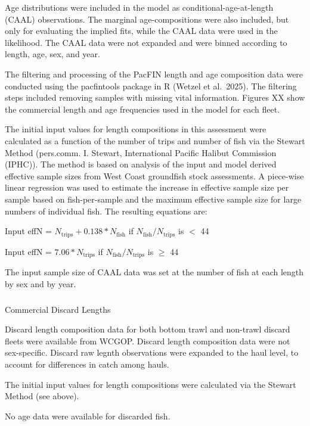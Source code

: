 \documentclass[
]{scrartcl}
\makeatletter
\let\oldsubparagraph\subparagraph
\renewcommand{\subparagraph}{
    \@ifstar
      \xxxSubParagraphStar
      \xxxSubParagraphNoStar
  }
\newcommand{\xxxSubParagraphStar}[1]{\oldsubparagraph*{#1}\mbox{}}
\newcommand{\xxxSubParagraphNoStar}[1]{\oldsubparagraph{#1}\mbox{}}
\makeatother
\begin{document}
Age distributions were included in the model as
conditional-age-at-length (CAAL) observations. The marginal
age-compositions were also included, but only for evaluating the implied
fits, while the CAAL data were used in the likelihood. The CAAL data
were not expanded and were binned according to length, age, sex, and
year.

The filtering and processing of the PacFIN length and age composition
data were conducted using the pacfintools package in R (Wetzel et
al.~2025). The filtering steps included removing samples with missing
vital information. Figures XX show the commercial length and age
frequencies used in the model for each fleet.

The initial input values for length compositions in this assessment were
calculated as a function of the number of trips and number of fish via
the Stewart Method (pers.comm. I. Stewart, International Pacific Halibut
Commission (IPHC)). The method is based on analysis of the input and
model derived effective sample sizes from West Coast groundfish stock
assessments. A piece-wise linear regression was used to estimate the
increase in effective sample size per sample based on fish-per-sample
and the maximum effective sample size for large numbers of individual
fish. The resulting equations are:

\begin{centering}

Input effN = $N_{\text{trips}} + 0.138 * N_{\text{fish}}$ if $N_{\text{fish}}/N_{\text{trips}}$ is $<$ 44

Input effN = $7.06 * N_{\text{trips}}$ if $N_{\text{fish}}/N_{\text{trips}}$ is $\geq$ 44

\end{centering}

The input sample size of CAAL data was set at the number of fish at each
length by sex and by year.

\subparagraph{Commercial Discard
Lengths}\label{commercial-discard-lengths}

Discard length composition data for both bottom trawl and non-trawl
discard fleets were available from WCGOP. Discard length composition
data were not sex-specific. Discard raw legnth observations were
expanded to the haul level, to account for differences in catch among
hauls.

The initial input values for length compositions were calculated via the
Stewart Method (see above).

No age data were available for discarded fish.
\end{document}
